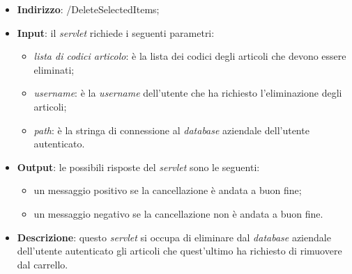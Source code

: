 
\begin{itemize}
	\item \textbf{Indirizzo}: /DeleteSelectedItems;
	\item \textbf{Input}: il \textit{servlet} richiede i seguenti parametri:
		\begin{itemize}
			\item \textit{lista di codici articolo}: è la lista dei codici degli articoli che devono essere eliminati;
			\item \textit{username}: è la \textit{username} dell'utente che ha richiesto l'eliminazione degli articoli;
			\item \textit{path}: è la stringa di connessione al \textit{database} aziendale dell'utente autenticato.
		\end{itemize}
	\item \textbf{Output}: le possibili risposte del \textit{servlet} sono le seguenti:
		\begin{itemize}
			\item un messaggio positivo se la cancellazione è andata a buon fine;
			\item un messaggio negativo se la cancellazione non è andata a buon fine.
		\end{itemize}
	\item \textbf{Descrizione}: questo \textit{servlet} si occupa di eliminare dal \textit{database} aziendale dell'utente autenticato gli articoli che quest'ultimo ha richiesto di rimuovere dal carrello.
\end{itemize}



